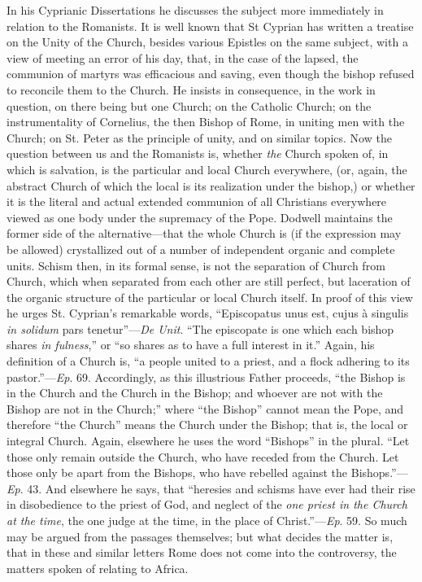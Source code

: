In his Cyprianic Dissertations he discusses the
subject more immediately in relation to the Romanists. It is well
known that St Cyprian has written a treatise on the Unity of the
Church, besides various Epistles on the same subject, with a view of
meeting an error of his day, that, in the case of the lapsed, the
communion of martyrs was efficacious and saving, even though the
bishop refused to reconcile them to the Church. He insists in
consequence, in the work in question, on there being but one Church;
on the Catholic Church; on the instrumentality of Cornelius, the then
Bishop of Rome, in uniting men with the Church; on St. Peter as the
principle of unity, and on similar topics. Now the question between us
and the Romanists is, whether \emph{the} Church spoken of, in which is
salvation, is the particular and local Church everywhere, (or, again,
the abstract Church of which the local is its realization under the
bishop,) or whether it is the literal and actual extended communion of
all Christians everywhere viewed as one body under the supremacy of
the Pope. Dodwell maintains the former side of the
alternative—that the whole Church is (if the expression may be
allowed) crystallized out of a number of independent organic and
complete units. Schism then, in its formal sense, is not the
separation of Church from Church, which when separated from each other
are still perfect, but laceration of the organic structure of the
particular or local Church itself. In proof of this view he urges St.
Cyprian's remarkable words, ``Episcopatus unus est, cujus à singulis \emph{in
solidum} pars tenetur''—\emph{De Unit}. ``The episcopate is one
which each bishop shares \emph{in fulness},'' or ``so shares as to have
a full interest in it.'' Again, his definition of a Church is, ``a
people united to a priest, and a flock adhering to its pastor.''—\emph{Ep}.
69. Accordingly, as this illustrious Father proceeds, ``the Bishop is
in the Church and the Church in the Bishop; and whoever are not with
the Bishop are not in the Church;'' where ``the Bishop'' cannot mean the
Pope, and therefore ``the Church'' means the Church under the Bishop;
that is, the local or integral Church. Again, elsewhere he uses the
word ``Bishops'' in the plural. ``Let those only remain outside the
Church, who have receded from the Church. Let those only be apart from
the Bishops, who have rebelled against the Bishops.''—\emph{Ep}. 43.
And elsewhere he says, that ``heresies and schisms have ever had their
rise in disobedience to the priest of God, and neglect of the \emph{one
priest in the Church at the time}, the one judge at the time, in
the place of Christ.''—\emph{Ep}. 59. So much may be argued from the
passages themselves; but what decides the matter is, that in these and
similar letters Rome does not come into the controversy, the matters
spoken of relating to Africa.

